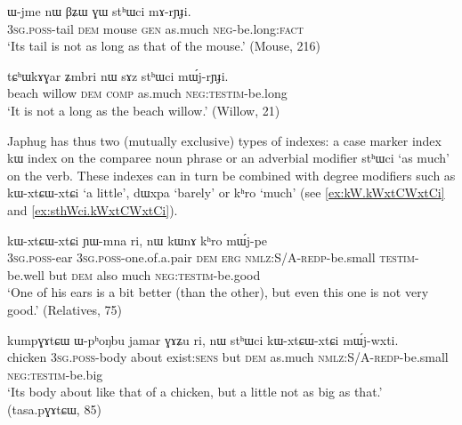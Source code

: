 \documentclass[oldfontcommands,oneside,a4paper,11pt]{article}
\newcommand{\ipa}[1]{{\phon #1}} %
\begin{document}
 
 \begin{exe}
\ex \label{ex:sthWci.mA}
\gll 
\ipa{ɯ-jme}  	\ipa{nɯ}  	\ipa{βʑɯ}  	\ipa{ɣɯ}  	\ipa{stʰɯci}  	\ipa{mɤ-rɲɟi.}  \\
\textsc{3sg.poss}-tail \textsc{dem} mouse \textsc{gen} as.much \textsc{neg}-be.long:\textsc{fact} \\
\glt `Its tail is not as long as that of the mouse.'  (Mouse, 216)
 \end{exe}
 
  \begin{exe}
\ex \label{ex:sthWci.mWj}
\gll 
 \ipa{tɕʰɯkɤɣar}  	\ipa{ʑmbri}  	\ipa{nɯ}  	\ipa{sɤz}  	\ipa{stʰɯci}  	\ipa{mɯ́j-rɲɟi.}  \\
beach willow \textsc{dem} \textsc{comp} as.much \textsc{neg:testim}-be.long \\
\glt `It is not a long as the beach willow.' (Willow, 21)
  \end{exe}
  
Japhug has thus two (mutually exclusive) types of indexes: a case marker index \ipa{kɯ} index on the comparee noun phrase or an adverbial modifier \ipa{stʰɯci} `as much' on the verb. These indexes can in turn be combined with degree modifiers such as \ipa{kɯ-xtɕɯ-xtɕi} `a little', \ipa{dɯxpa} `barely' or \ipa{kʰro} `much' (see \ref{ex:kW.kWxtCWxtCi} and \ref{ex:sthWci.kWxtCWxtCi}).
  
    \begin{exe}
\ex \label{ex:kW.kWxtCWxtCi}
\gll 
  [\ipa{ɯ-rna}  	\ipa{ɯ-ntsi}  	\ipa{nɯ}]  	\ipa{kɯ}  	\ipa{kɯ-xtɕɯ-xtɕi}  	\ipa{ɲɯ-mna}  	\ipa{ri,}  	\ipa{nɯ}  	\ipa{kɯnɤ}  	\ipa{kʰro}  	\ipa{mɯ́j-pe}  \\
  \textsc{3sg.poss}-ear \textsc{3sg.poss}-one.of.a.pair \textsc{dem} \textsc{erg} \textsc{nmlz:S/A-redp}-be.small \textsc{testim}-be.well but \textsc{dem} also much \textsc{neg:testim}-be.good \\
  \glt `One of his ears is a bit better (than the other), but even this one is not very good.' (Relatives, 75)
  \end{exe}
 
     \begin{exe}
\ex \label{ex:sthWci.kWxtCWxtCi}
\gll 
  \ipa{kumpɣɤtɕɯ}  	\ipa{ɯ-pʰoŋbu}  	\ipa{jamar}  	\ipa{ɣɤʑu}  	\ipa{ri,}  	\ipa{nɯ}  	\ipa{stʰɯci}  	\ipa{kɯ-xtɕɯ-xtɕi}  	\ipa{mɯ́j-wxti.}  \\
  chicken \textsc{3sg.poss}-body about exist:\textsc{sens} but \textsc{dem} as.much \textsc{nmlz:S/A-redp}-be.small \textsc{neg:testim}-be.big \\
\glt `Its body about like that of a chicken, but a little not as big as that.' (tasa.pɣɤtɕɯ, 85)
  \end{exe}
\end{document}
